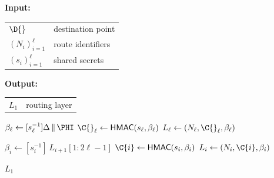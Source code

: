 \caption{Encryption}
\label{algo:encryption}
\begin{algorithmic}[1]

\Statex \textbf{Input:}
\Statex \quad
  \begin{tabular}{@{}ll@{}}
    $\D{}$                & destination point \\
    $(N_i)_{i=1}^{\ell}$   & route identifiers \\
    $(s_i)_{i=1}^{\ell}$   & shared secrets
  \end{tabular}
\Statex \textbf{Output:}
\Statex \quad
  \begin{tabular}{@{}ll@{}}
    $L_1$ & routing layer
  \end{tabular}
\Statex

\State $\beta_\ell \gets [s_\ell^{-1}]\Delta \,\Vert\, \PHI$
\State $\C{}_\ell \gets \mathsf{HMAC}(s_\ell,\beta_\ell)$
\State $L_\ell \gets (N_\ell, \C{}_\ell, \beta_\ell)$

    \State $\beta_i \gets [s_i^{-1}] \: L_{i+1}[1:2\ell-1]$
    \State $\C{i} \gets \mathsf{HMAC}(s_i,\beta_i)$
    \State $L_i \gets (N_i,\C{i}, \beta_i)$
\EndFor

\State \Return $L_1$

\end{algorithmic}